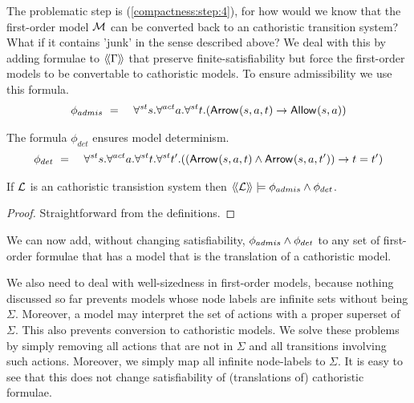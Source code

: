 \NI The problematic step is (\ref{compactness:step:4}), for how would
we know that the first-order model $\mathcal{M}$ can be converted back to
an cathoristic transition system? What if it contains 'junk' in the
sense described above?  We deal with this by adding formulae to 
$\langle\!\langle \Gamma \rangle\!\rangle$ that preserve finite-satisfiability but force the
first-order models to be convertable to cathoristic models.
 To ensure admissibility we use this formula.
\begin{eqnarray*}
   \phi_{admis} 
      & \ =\ &
   \forall^{st} s.\forall^{act} a.\forall^{st} t.( \mathsf{Arrow}^{}(s, a, t) \rightarrow \mathsf{Allow}^{}(s, a)) 
\end{eqnarray*}

\NI The formula $\phi_{det}$ ensures model determinism.
\begin{eqnarray*}
   \phi_{det} 
      & \ =\ &
   \forall^{st} s.\forall^{act} a.\forall^{st} t.\forall^{st} t'.
   ((\mathsf{Arrow}^{}(s, a, t)  \land \mathsf{Arrow}^{}(s, a, t') ) \rightarrow t = t' )   
\end{eqnarray*}

\begin{lemma}\label{compactness:lemma:23399}
If $\mathcal{L}$ is an cathoristic transistion system then $\langle\!\langle \mathcal{L} \rangle\!\rangle \models
\phi_{admis} \land \phi_{det}$.
\end{lemma}

\begin{proof}
Straightforward from the definitions.
\end{proof}

\NI We can now add, without changing satisfiability, $\phi_{admis}
\land \phi_{det}$ to any set of first-order formulae that has a model
that is the translation of a cathoristic model.

We also need to deal with well-sizedness in first-order models,
because nothing discussed so far prevents models whose node labels are
infinite sets without being $\Sigma$.  Moreover, a model may interpret
the set of actions with a proper superset of $\Sigma$.  This also
prevents conversion to cathoristic models. We solve these problems by
simply removing all actions that are not in $\Sigma$ and all
transitions involving such actions.  Moreover, we simply map all
infinite node-labels to $\Sigma$. It is easy to see that this does not
change satisfiability of (translations of) cathoristic formulae.


